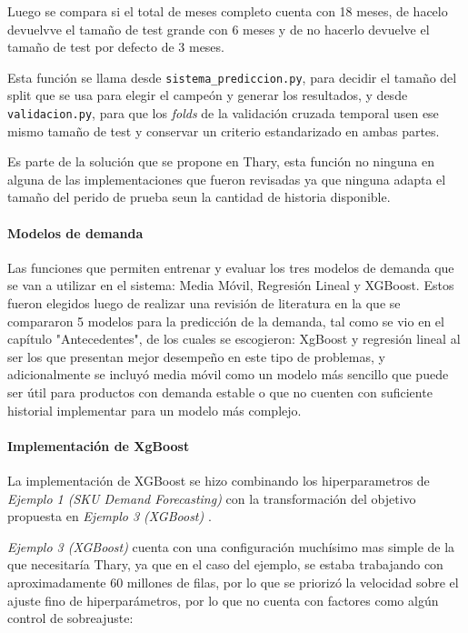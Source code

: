 Luego se compara si el total de meses completo cuenta con 18 meses, de hacelo devuelvve el tamaño de test grande con 6 meses y de no hacerlo devuelve el tamaño de test por defecto de 3 meses.

Esta función se llama desde \texttt{sistema\_prediccion.py}, para decidir el tamaño del split que se usa para elegir el campeón y generar los resultados, y desde \texttt{validacion.py}, para que los \textit{folds} de la validación cruzada temporal usen ese mismo tamaño de test y conservar un criterio estandarizado en ambas partes.

Es parte de la solución que se propone en Thary, esta función no ninguna en alguna de las implementaciones que fueron revisadas ya que ninguna adapta el tamaño del perido de prueba seun la cantidad de historia disponible. 

\paragraph{Modelos de demanda}

Las funciones que permiten entrenar y evaluar los tres modelos de demanda que se van a utilizar en el sistema: Media Móvil, Regresión Lineal y XGBoost. Estos fueron elegidos luego de realizar una revisión de literatura en la que se compararon 5 modelos para la predicción de la demanda, tal como se vio en el capítulo "Antecedentes", de los cuales se escogieron: XgBoost y regresión lineal al ser los que presentan mejor desempeño en este tipo de problemas, y adicionalmente se incluyó media móvil como un modelo más sencillo que puede ser útil para productos con demanda estable o que no cuenten con suficiente historial implementar para un modelo más complejo.

\paragraph{Implementación de XgBoost}

La implementación de XGBoost se hizo combinando los hiperparametros de \textit{Ejemplo 1 (SKU Demand Forecasting)} \cite{ejemplo1_demandforecast} con la transformación del objetivo propuesta en \textit{Ejemplo 3 (XGBoost)} \cite{ejemplo3_ksmooi_inventorydemand}.


\textit{Ejemplo 3 (XGBoost)} \cite{ejemplo3_ksmooi_inventorydemand} cuenta con una configuración muchísimo mas simple de la que necesitaría Thary, ya que en el caso del ejemplo, se estaba trabajando con aproximadamente 60 millones de filas, por lo que se priorizó la velocidad sobre el ajuste fino de hiperparámetros, por lo que no cuenta con factores como algún control de sobreajuste:


